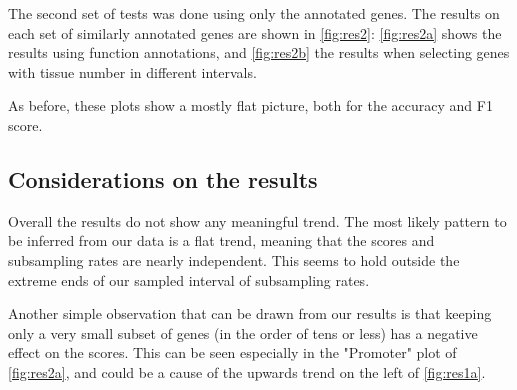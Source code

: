 The second set of tests was done using only the annotated genes. The results on each set of similarly annotated genes are shown in \autoref{fig:res2}: \autoref{fig:res2a} shows the results using function annotations, and \autoref{fig:res2b} the results when selecting genes with tissue number in different intervals.

As before, these plots show a mostly flat picture, both for the accuracy and F1 score.


\subsection{Considerations on the results}
Overall the results do not show any meaningful trend. The most likely pattern to be inferred from our data is a flat trend, meaning that the scores and subsampling rates are nearly independent. This seems to hold outside the extreme ends of our sampled interval of subsampling rates.

Another simple observation that can be drawn from our results is that keeping only a very small subset of genes (in the order of tens or less) has a negative effect on the scores.
This can be seen especially in the "Promoter" plot of \autoref{fig:res2a}, and could be a cause of the upwards trend on the left of \autoref{fig:res1a}.


